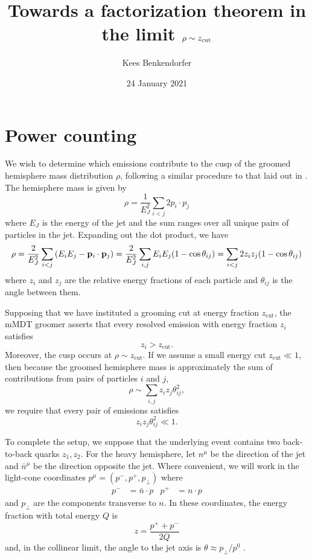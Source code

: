 \documentclass[11pt,twoside,reqno]{amsart}
\title{Towards a factorization theorem in the limit $\rho \sim \zcut$}
\author{Kees Benkendorfer}
\date{24 January 2021}
\theoremstyle{plain}
\theoremstyle{remark}
\theoremstyle{definition}
\theoremstyle{remark}
\theoremstyle{definition}
\theoremstyle{definition}
\newcommand{\zcut}{z_\mathrm{cut}}
\begin{document}
\maketitle

\tableofcontents

\section{Power counting}

	We wish to determine which emissions contribute to the cusp of the groomed hemisphere mass distribution $\rho$, following a similar procedure to that laid out in \cite{frye_factorization_2016}. The hemisphere mass is given by
	\begin{equation}
		\rho = \frac{1}{E_J^2}\sum_{i < j} 2p_i \cdot p_j
	\end{equation}
	where $E_J$ is the energy of the jet and the sum ranges over all unique pairs of particles in the jet. Expanding out the dot product, we have
	\begin{equation}
		\rho = \frac{2}{E_J^2} \sum_{i<j} \qty(E_i E_j - \vb{p}_i \cdot \vb{p}_j) = \frac{2}{E_J^2}\sum_{i,j} E_i E_j\qty(1 - \cos \theta_{ij}) = \sum_{i < j} 2z_i z_j \qty(1 - \cos\theta_{ij})
	\end{equation}
	where $z_i$ and $z_j$ are the relative energy fractions of each particle and $\theta_{ij}$ is the angle between them.

	Supposing that we have instituted a grooming cut at energy fraction $\zcut$, the mMDT groomer asserts that every resolved emission with energy fraction $z_i$ satisfies
	\begin{equation}
		z_i > \zcut.
	\end{equation}
	Moreover, the cusp occurs at $\rho \sim \zcut$. If we assume a small energy cut $\zcut \ll 1$, then because the groomed hemisphere mass is approximately the sum of contributions from pairs of particles $i$ and $j$,
	\begin{equation}\label{eq:rho sum}
		\rho \sim \sum_{i,j} z_i z_j \theta_{ij}^2,
	\end{equation}
	we require that every pair of emissions satisfies
	\begin{equation}\label{eq:z pairs small}
		z_i z_j \theta_{ij}^2 \ll 1.
	\end{equation}
	
	To complete the setup, we suppose that the underlying event contains two back-to-back quarks $z_1, z_2$. For the heavy hemisphere, let $n^\mu$ be the direction of the jet and $\bar n^\mu$ be the direction opposite the jet. Where convenient, we will work in the light-cone coordinates $p^\mu = (p^-, p^+, p_\perp)$ where
	\begin{align}
		p^- &= \bar n \cdot p & p^+ &= n \cdot p
	\end{align}
	and $p_\perp$ are the components transverse to $n$. In these coordinates, the energy fraction with total energy $Q$ is
	\begin{equation}
		z = \frac{p^+ + p^-}{2Q}
	\end{equation}
	and, in the collinear limit, the angle to the jet axis is $\theta \approx p_\perp / p^0$ \cite{frye_factorization_2016}.
\end{document}
